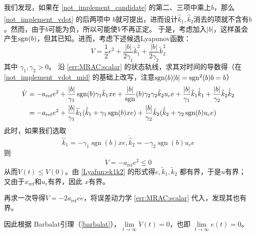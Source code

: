 我们发现，如果在 \eqref{not_implement_candidate} 的第二、三项中乘上$b$，那么 \eqref{not_implement_vdot} 的后两项中
$b$就可提出，进而设计$\dot{\hat{k}}_1,\dot{\hat{k}}_2$消去的项就不含有$b$。然而，由于$b$可能为负，所以可能使$V$不再正定。
于是，考虑加入$|b|$，这样虽会产生$\operatorname{sgn}(b)$，但其已知。进而，考虑下述候选Lyapunov函数：
\begin{equation}
  V = \frac{1}{2} e^2 + \frac{| b |}{2 \gamma_1} \tilde{k}^2_1 + \frac{| b
  |}{2 \gamma_2} \tilde{k}^2_2 \label{Lyafun:ek1k2}
\end{equation}
其中 $\gamma_1, \gamma_2 > 0$。
沿 \eqref{err:MRAC:scalar} 的状态轨线，求其对时间的导数得（在 \eqref{not_implement_vdot_mid} 的基础上改写，注意$\operatorname{sgn}(b)|b|=\operatorname{sgn}^2(b)b=b$）
\begin{align*}
    \dot{V}   &= - a_{\operatorname{ref}} e^2 + \frac{ | b |}{\gamma_1} \operatorname{sgn}(b) \gamma_1 \tilde{k} _1 x  e + \frac{| b |}{\operatorname{sgn}}(b){\gamma_2} \gamma_2
  \tilde{k} _2 u_c e + \frac{| b |}{\gamma_1}\tilde{k} _1 \dot{\hat{k}}_1 + \frac{| b |}{\gamma_2}\tilde{k} _2
  \dot{\hat{k}}_2 \\
    & = - a_{\operatorname{ref}} e^2 + \frac{| b
   |}{\gamma_1} \widetilde{ k} _1 (\dot{\hat{k}}_1 + \gamma_1
   \operatorname{sgn} (b) x  e) + \frac{| b |}{\gamma_2}
   \tilde{k} _2 (\dot{\hat{k}}_2 + \gamma_2 \operatorname{sgn}
   (b)  u_c e)
\end{align*}
此时，如果我们选取
\begin{equation*}
  \dot{\hat{k}}_1 = -  \gamma_1 \ensuremath{\operatorname{sgn}} (b) x  e,
  \dot{\hat{k}}_2 = -  \gamma_2 \ensuremath{\operatorname{sgn}} (b)  u_c e
\end{equation*}
则
\begin{equation*}
  \dot{V} = - a_{\ensuremath{\operatorname{ref}}} e^2 \leq 0
\end{equation*}
从而$V (t) \leq V (0)$。由 \eqref{Lyafun:ek1k2} 的形式得$e, \tilde{k} _1,
\tilde{k} _2$ 都有界，于是$u$有界；又由于$x_\mathrm{ref}$和$u_c$有界，因此 $x$有界。

再求一次导得$\ddot{V} = - 2a_{\ensuremath{\operatorname{ref}}} e  \dot{e}$，将误差动力学 \eqref{err:MRAC:scalar} 代入，发现其也有界。

因此根据 Barbalat引理（\ref{barbalat}），$\lim\limits_{t \rightarrow \infty}
\dot{V} (t) = 0$，也即 $\lim\limits_{t \rightarrow \infty} e (t) = 0$。

